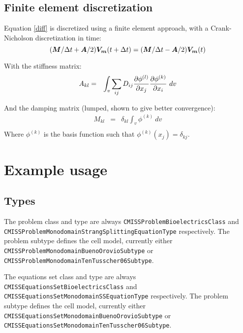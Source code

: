 \subsection{Finite element discretization}
Equation \ref{diff} is discretized using a finite element approach, with a Crank-Nicholson discretization in time:\\
\begin{equation}
 (\boldsymbol{M}/\Delta t+\boldsymbol{A}/2) \boldsymbol{V_m}(t+\Delta t) = (\boldsymbol{M}/\Delta t-\boldsymbol{A}/2) \boldsymbol{V_m}(t)
\end{equation}

With the stiffness matrix:
\begin{eqnarray}
A_{kl} &=& \int_v \sum_{ij} D_{ij} \frac{\partial \phi^{(l)}}{\partial x_j} \frac{\partial \phi^{(k)}}{\partial x_i} ~dv
\end{eqnarray}

And the damping matrix (lumped, shown to give better convergence):
\begin{eqnarray}
M_{kl} &=& \delta_{kl}  \int_v \phi^{(k)} ~ dv \\
\end{eqnarray}
Where $\phi^{(k)}$ is the basis function such that $\phi^{(k)}(x_j)=\delta_{kj}$.

\section{Example usage}

\subsection{Types}
The problem class and type are always \verb!CMISSProblemBioelectricsClass! and \verb!CMISSProblemMonodomainStrangSplittingEquationType! respectively.
The problem subtype defines the cell model, currently either
\verb!CMISSProblemMonodomainBuenoOrovioSubtype! or \verb!CMISSProblemMonodomainTenTusscher06Subtype!.

The equations set class and type are always \verb!CMISSEquationsSetBioelectricsClass! and \verb!CMISSEquationsSetMonodomainSSEquationType! respectively.
The problem subtype defines the cell model, currently either
\verb!CMISSEquationsSetMonodomainBuenoOrovioSubtype! or \verb!CMISSEquationsSetMonodomainTenTusscher06Subtype!.

